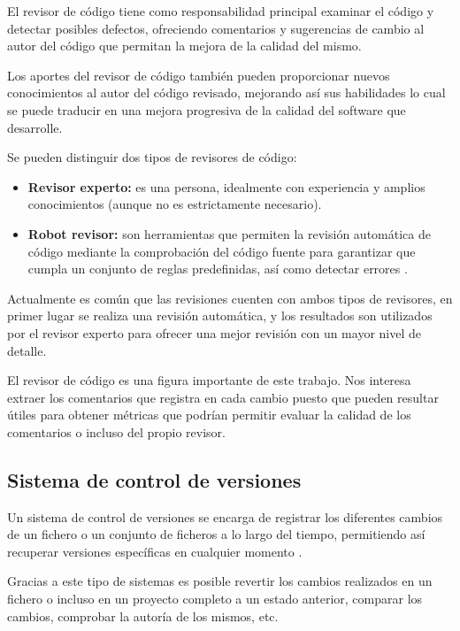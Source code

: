El revisor de código tiene como responsabilidad principal examinar el código y detectar posibles defectos, ofreciendo comentarios y sugerencias de cambio al autor del código que permitan la mejora de la calidad del mismo.

Los aportes del revisor de código también pueden proporcionar nuevos conocimientos al autor del código revisado, mejorando así sus habilidades lo cual se puede traducir en una mejora progresiva de la calidad del software que desarrolle.

Se pueden distinguir dos tipos de revisores de código:

\begin{itemize}
\tightlist
	\item \textbf{Revisor experto:} es una persona, idealmente con experiencia y amplios conocimientos (aunque no es estrictamente necesario).
	\item \textbf{Robot revisor:} son herramientas que permiten la revisión automática de código mediante la comprobación del código fuente para garantizar que cumpla un conjunto de reglas predefinidas, así como detectar errores \cite{wiki:001}.
\end{itemize}

Actualmente es común que las revisiones cuenten con ambos tipos de revisores, en primer lugar se realiza una revisión automática, y los resultados son utilizados por el revisor experto para ofrecer una mejor revisión con un mayor nivel de detalle.

El revisor de código es una figura importante de este trabajo. Nos interesa extraer los comentarios que registra en cada cambio puesto que pueden resultar útiles para obtener métricas que podrían permitir evaluar la calidad de los comentarios o incluso del propio revisor.

\subsection{Sistema de control de versiones}

Un sistema de control de versiones se encarga de registrar los diferentes cambios de un fichero o un conjunto de ficheros a lo largo del tiempo, permitiendo así recuperar versiones específicas en cualquier momento \cite{Chacon:2014:PG:2695634}.

Gracias a este tipo de sistemas es posible revertir los cambios realizados en un fichero o incluso en un proyecto completo a un estado anterior, comparar los cambios, comprobar la autoría de los mismos, etc.

